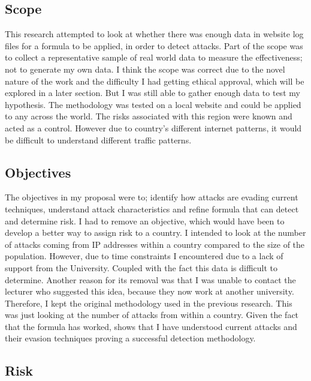 \subsection{Scope}

This research attempted to look at whether there was enough data in website log files for a formula to be applied, in order to detect attacks. Part of the scope was to collect a representative sample of real world data to measure the effectiveness; not to generate my own data. I think the scope was correct due to the novel nature of the work and the difficulty I had getting ethical approval, which will be explored in a later section. But I was still able to gather enough data to test my hypothesis. The methodology was tested on a local website and could be applied to any across the world. The risks associated with this region were known and acted as a control. However due to country's different internet patterns, it would be difficult to understand different traffic patterns. 


\subsection{Objectives}

The objectives in my proposal were to; identify how attacks are evading current techniques, understand attack characteristics and refine formula that can detect and determine risk. I had to remove an objective, which would have been to develop a better way to assign risk to a country. I intended to look at the number of attacks coming from IP addresses within a country compared to the size of the population. However, due to time constraints I encountered due to a lack of support from the University. Coupled with the fact this data is difficult to determine. Another reason for its removal was that I was unable to contact the lecturer who suggested this idea, because they now work at another university. Therefore, I kept the original methodology used in the previous research. This was just looking at the number of attacks from within a country. Given the fact that the formula has worked, shows that I have understood current attacks and their evasion techniques proving a successful detection methodology.

\subsection{Risk}

